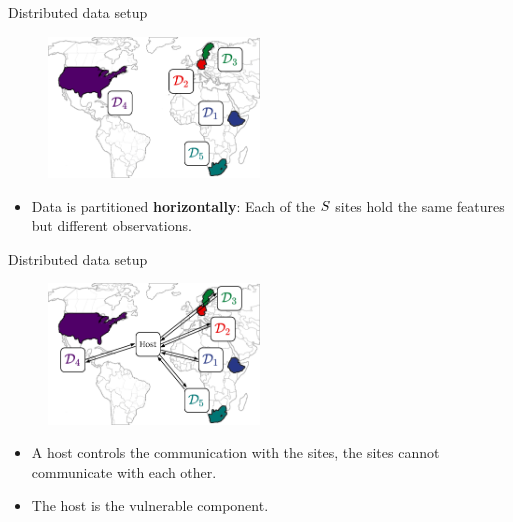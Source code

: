 \documentclass[t,10pt]{beamer}
\begin{document}
\begin{frame}{Distributed data setup}
  \begin{figure}
    \centering
    \includegraphics[width=0.5\textwidth]{figures/weltkarte.png}
  \end{figure}
  \begin{itemize}
    \item Data is partitioned \textbf{horizontally}: Each of the $S$ sites hold the same features but different observations.
  \end{itemize}
\end{frame}

\begin{frame}{Distributed data setup}
  \begin{figure}
    \centering
    \includegraphics[width=0.5\textwidth]{figures/fig-sites-host.png}
  \end{figure}
  \begin{itemize}
    \item A host controls the communication with the sites, the sites cannot communicate with each other.
    \item The host is the vulnerable component.%
  \end{itemize}
  \addtocounter{framenumber}{-1}
\end{frame}
\end{document}
